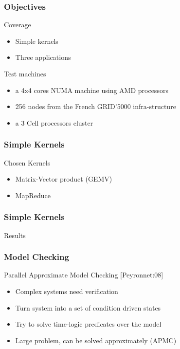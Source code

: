 \frame
{
  \frametitle{Objectives}
  \begin{block}{Coverage}
 \begin{itemize}
  \footnotesize
  \item Simple kernels
  \item Three applications
  \end{itemize}
  \end{block}{}

  \begin{block}{Test machines}
  \begin{itemize}
  \footnotesize
  \item a 4x4 cores NUMA machine using AMD processors
  \item 256 nodes from the French GRID'5000 infra-structure
  \item a 3 Cell processors cluster
  \end{itemize}
  \end{block}{}
}

\frame
{
  \frametitle{Simple Kernels}
  \begin{block}{Chosen Kernels}
  \begin{itemize}
  \item Matrix-Vector product (GEMV)
  \item MapReduce
  \end{itemize}
  \end{block}{}
}

\frame
{
  \frametitle{Simple Kernels}
  \begin{block}{Results}
  \end{block}{}
}

\frame
{
  \frametitle{Model Checking}
  \begin{block}{Parallel Approximate Model Checking [Peyronnet:08]}
  \begin{itemize}
  \footnotesize
  \item Complex systems need verification
  \item Turn system into a set of condition driven states
  \item Try to solve time-logic predicates over the model
  \item Large problem, can be solved approximately (APMC)
  \end{itemize}
  \end{block}{}
}

